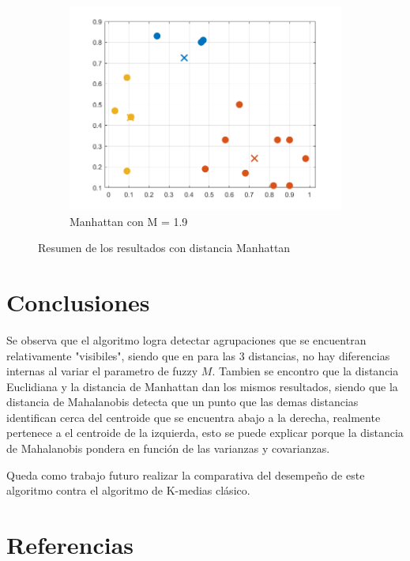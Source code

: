 \documentclass[11pt, letterpaper]{article}
\begin{document}
\begin{figure}[h!]
\begin{subfigure}[b]{0.50\textwidth}
		\includegraphics[width=\textwidth]{IMG/R33.png}
		\caption{Manhattan con  M = 1.9}
		\label{fig:r9}
	\end{subfigure}\hfill
	\caption{Resumen de los resultados con distancia Manhattan}
	\label{fig:cuadro_r3}
\end{figure}

\newpage

\section{Conclusiones}

Se observa que el algoritmo logra detectar agrupaciones que se encuentran relativamente "visibiles", siendo que en para las 3 distancias, no hay diferencias internas al variar el parametro de fuzzy $M$. Tambien se encontro que la distancia Euclidiana y la distancia de Manhattan dan los mismos resultados, siendo que la distancia de Mahalanobis  detecta que un punto que las demas distancias identifican cerca del centroide que se encuentra abajo a la derecha, realmente pertenece a el centroide de la izquierda, esto se puede explicar porque la distancia de Mahalanobis pondera en función de las varianzas y covarianzas.

Queda como trabajo futuro realizar la comparativa del desempeño de este algoritmo contra el algoritmo de K-medias clásico.


\newpage

\section{Referencias}
\end{document}
